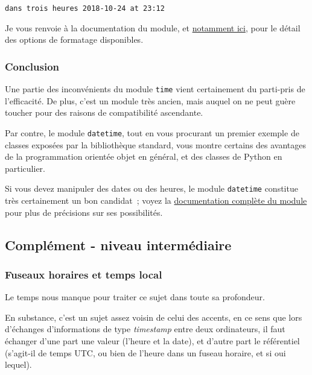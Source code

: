     \begin{Verbatim}[commandchars=\\\{\}]
dans trois heures 2018-10-24 at 23:12

    \end{Verbatim}

    Je vous renvoie à la documentation du module, et
\href{https://docs.python.org/3/library/datetime.html\#strftime-and-strptime-behavior}{notamment
ici}, pour le détail des options de formatage disponibles.

    \hypertarget{conclusion}{%
\subsubsection{Conclusion}\label{conclusion}}

    Une partie des inconvénients du module \texttt{time} vient certainement
du parti-pris de l'efficacité. De plus, c'est un module très ancien,
mais auquel on ne peut guère toucher pour des raisons de compatibilité
ascendante.

Par contre, le module \texttt{datetime}, tout en vous procurant un
premier exemple de classes exposées par la bibliothèque standard, vous
montre certains des avantages de la programmation orientée objet en
général, et des classes de Python en particulier.

Si vous devez manipuler des dates ou des heures, le module
\texttt{datetime} constitue très certainement un bon candidat~; voyez la
\href{https://docs.python.org/3/library/datetime.html}{documentation
complète du module} pour plus de précisions sur ses possibilités.

    \hypertarget{compluxe9ment---niveau-intermuxe9diaire}{%
\subsection{Complément - niveau
intermédiaire}\label{compluxe9ment---niveau-intermuxe9diaire}}

    \hypertarget{fuseaux-horaires-et-temps-local}{%
\subsubsection{Fuseaux horaires et temps
local}\label{fuseaux-horaires-et-temps-local}}

    Le temps nous manque pour traiter ce sujet dans toute sa profondeur.

En substance, c'est un sujet assez voisin de celui des accents, en ce
sens que lors d'échanges d'informations de type \emph{timestamp} entre
deux ordinateurs, il faut échanger d'une part une valeur (l'heure et la
date), et d'autre part le référentiel (s'agit-il de temps UTC, ou bien
de l'heure dans un fuseau horaire, et si oui lequel).

